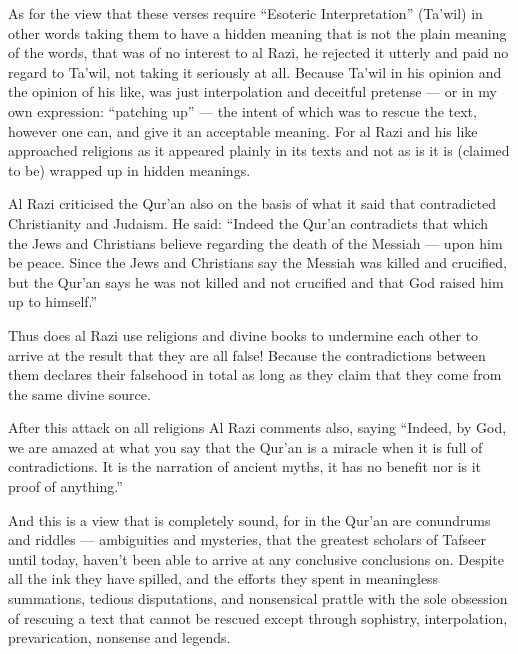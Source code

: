 \documentclass[12pt]{book}
\begin{document}
As for the view that these verses require “Esoteric Interpretation” (Ta’wil)
in other words taking them to have a hidden meaning that is not the plain
meaning of the words, that was of no interest to al Razi, he rejected it
utterly and paid no regard to Ta’wil, not taking it seriously at all.
Because Ta’wil in his opinion and the opinion of his like, was just
interpolation and deceitful pretense — or in my own expression:
“patching up” — the intent of which was to rescue the text, however one can,
and give it an acceptable meaning.
For al Razi and his like approached religions as it appeared plainly
in its texts and not as is it is (claimed to be)
wrapped up in hidden meanings.\footnotemark


Al Razi criticised the Qur’an also on the basis of what it said that
contradicted Christianity and Judaism.
He said: “Indeed the Qur’an contradicts that which the Jews and Christians
believe regarding the death of the Messiah — upon him be peace.
Since the Jews and Christians say the Messiah was killed and crucified,
but the Qur’an says he was not killed and not crucified and that God
raised him up to himself.”\footnotemark


Thus does al Razi use religions and divine books to undermine each other
to arrive at the result that they are all false!
Because the contradictions between them declares their falsehood in total
as long as they claim that they come from the same divine source.

After this attack on all religions Al Razi comments also, saying
“Indeed, by God, we are amazed at what you say that the Qur’an is a miracle
when it is full of contradictions.
It is the narration of ancient myths,
it has no benefit nor is it proof of anything.”\footnotemark


And this is a view that is completely sound,
for in the Qur’an are conundrums and riddles — ambiguities and mysteries,
that the greatest scholars of Tafseer until today,
haven’t been able to arrive at any conclusive conclusions on.
Despite all the ink they have spilled,
and the efforts they spent in meaningless summations, tedious disputations,
and nonsensical prattle with the sole obsession of rescuing a text
that cannot be rescued except through sophistry, interpolation,
prevarication, nonsense and legends.\footnotemark
\end{document}
